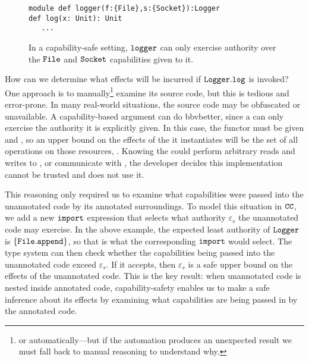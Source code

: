 \begin{figure}
\vspace*{-5mm}
\begin{lstlisting}
module def logger(f:{File},s:{Socket}):Logger
def log(x: Unit): Unit
   ...
\end{lstlisting}
\vspace*{-5mm}
\caption{In a capability-safe setting, $\mathtt{logger}$ can only exercise authority over the $\mathtt{File}$ and $\mathtt{Socket}$ capabilities given to it.}
\label{fig:cc_motivation}
\end{figure}

How can we determine what effects will be incurred if $\mathtt{Logger.log}$ is
invoked? One approach is to manually\footnote{or automatically---but if the
  automation produces an unexpected result we must fall back to manual
  reasoning to understand why.} examine its source code, but this is
tedious and error-prone. In many real-world situations, the source
code may be obfuscated or unavailable. A capability-based argument can do
bbvbetter, since a  can only exercise the authority it is explicitly
given. In this case, the  functor must be given  and
, so an upper bound on the effects of the  it
instantiates will be the set of all operations on those resources,
. Knowing the  could perform
arbitrary reads and writes to , or communicate with , the developer decides this implementation cannot be trusted
and does not use it.

This reasoning only required us to examine what capabilities were passed into
the unannotated code by its annotated surroundings. To model this situation in
$\mathtt{CC}$, we add a new $\mathtt{import}$ expression
that selects what authority $\varepsilon_s$ the unannotated code may
exercise. In the above example, the expected least authority of
$\mathtt{Logger}$ is $\{ \mathtt{File.append} \}$, so that is what the
corresponding $\mathtt{import}$ would select. The type system can then
check whether the capabilities being passed into the unannotated code
exceed $\varepsilon_s$. If it accepts, then $\varepsilon_s$ is a safe
upper bound on the effects of the unannotated code. This is the
key result: when unannotated code is nested inside annotated code,
capability-safety enables us to make a safe inference about its
effects by examining what capabilities are being passed in by the
annotated code.

